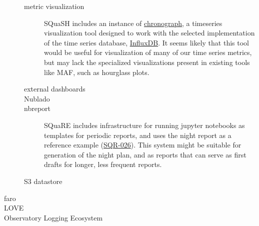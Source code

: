 \begin{description}
\begin{description}
\item[{metric visualization}] SQuaSH includes an instance of \href{https://docs.influxdata.com/chronograf/v1.8/}{chronograph}, a timeseries visualization tool designed to work with the selected implementation of the time series database, \href{https://www.influxdata.com/products/influxdb/}{InfluxDB}. It seems likely that this tool would be useful for visualization of many of our time series metrics, but may lack the specialized visualizations present in existing tools like MAF, such as hourglass plots.
\item[{external dashboards}] 

\item[{Nublado}] 

\item[{nbreport}] SQuaRE includes infrastructure for running jupyter notebooks as templates for periodic reports, and uses the night report as a reference example (\href{https://sqr-026.lsst.io/}{SQR-026}). This system might be suitable for generation of the night plan, and as reports that can serve as first drafts for longer, less frequent reports.
\item[{S3 datastore}] 
\end{description}
\item[{faro}] 

\item[{LOVE}] 

\item[{Observatory Logging Ecosystem}] 
\end{description}
